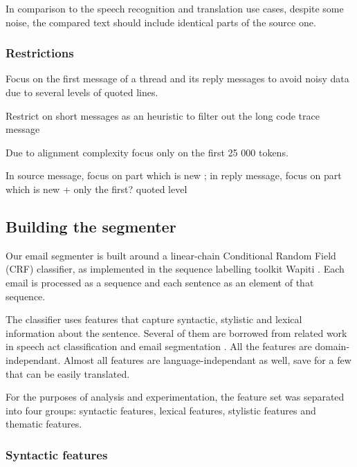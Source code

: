 
In comparison to the speech recognition and translation use cases, despite some noise, the compared text should include identical parts of the source one.



\subsubsection{Restrictions}
\label{}

Focus on the first message of a thread and its reply messages to avoid noisy data due to several levels of quoted lines.

Restrict on short messages as an heuristic to filter out the long code trace message

Due to alignment complexity focus only on the first 25 000 tokens.

In source message, focus on part which is new ; in reply message, focus on part which is new + only the first? quoted level 
 


\subsection{Building the segmenter}

Our email segmenter is built around a linear-chain Conditional Random Field (CRF) classifier, as implemented in the sequence labelling toolkit Wapiti \cite{lavergne2010practical}. Each email is processed as a sequence and each sentence as an element of that sequence.

The classifier uses features that capture syntactic, stylistic and lexical information about the sentence. Several of them are borrowed from related work in speech act classification \cite{qadir2011classifying} and email segmentation \cite{lampert2009segmenting}. All the features are domain-independant. Almost all features are language-independant as well, save for a few that can be easily translated.

For the purposes of analysis and experimentation, the feature set was separated into four groups: syntactic features, lexical features, stylistic features and thematic features.

\subsubsection{Syntactic features}

